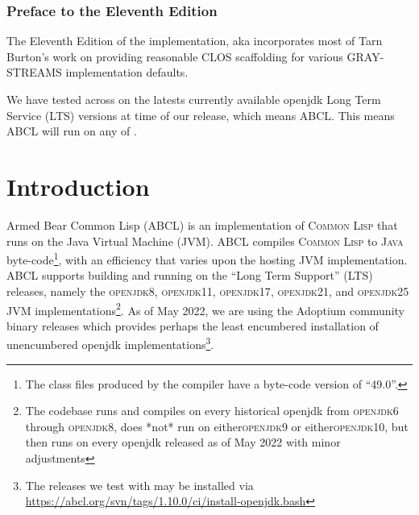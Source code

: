 \documentclass[10pt]{book}
\begin{document}
\subsection{Preface to the Eleventh Edition}

The Eleventh Edition of the implementation, aka  incorporates
most of Tarn Burton's work on providing reasonable \textsc{CLOS} scaffolding
for various \textsc{GRAY-STREAMS} implementation defaults.

We have tested across on the latests currently available openjdk Long
Term Service (LTS) versions at time of our release, which means ABCL.
This means ABCL will run on any of .

\chapter{Introduction}

Armed Bear Common Lisp (\textsc{ABCL}) is an implementation of
\textsc{Common Lisp} that runs on the Java Virtual Machine
(\textsc{JVM}).  \textsc{ABCL} compiles \textsc{Common Lisp} to
\textsc{Java} byte-code\footnote{The class files produced by the
compiler have a byte-code version of ``49.0''.}, with an efficiency
that varies upon the hosting JVM implementation.  \textsc{ABCL}
supports building and running on the ``Long Term Support'' (LTS) releases, namely the \textsc{openjdk8},
\textsc{openjdk11}, \textsc{openjdk17}, \textsc{openjdk21}, and
\textsc{openjdk25} \textsc{JVM} implementations\footnote{The codebase
runs and compiles on every historical openjdk from \textsc{openjdk6}
through \textsc{openjdk8}, does *not* run on either\textsc{openjdk9}
or either\textsc{openjdk10}, but then runs on every openjdk released
as of May 2022 with minor adjustments}.  As of May 2022, we are using
the Adoptium community \cite{adoptium} binary releases which provides
perhaps the least encumbered installation of unencumbered openjdk
implementations\footnote{The releases we test with may be installed
via \url{https://abcl.org/svn/tags/1.10.0/ci/install-openjdk.bash}}.
\end{document}
